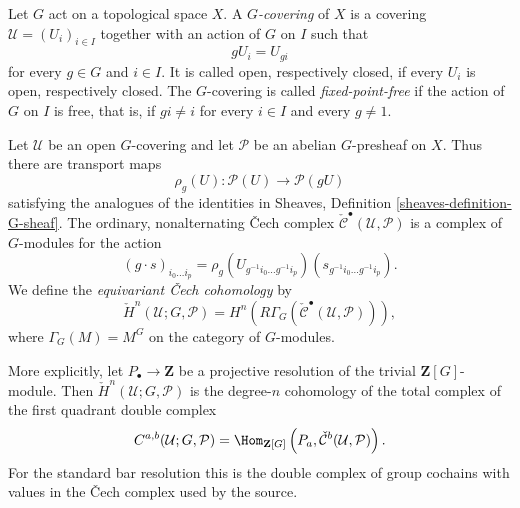 \begin{definition}
\label{definition-equivariant-cech-cohomology}
\begin{reference}
\cite[Chapter V, \S 5.5, p. 208]{Tohoku}
\end{reference}
Let $G$ act on a topological space $X$. A \emph{$G$-covering} of $X$
is a covering $\mathcal{U}=(U_i)_{i\in I}$ together with an action of
$G$ on $I$ such that
$$
gU_i=U_{gi}
$$
for every $g\in G$ and $i\in I$. It is called open, respectively closed,
if every $U_i$ is open, respectively closed.
The $G$-covering is called \emph{fixed-point-free} if the action of $G$
on $I$ is free, that is, if $gi\neq i$ for every $i\in I$ and every
$g\neq 1$.

Let $\mathcal{U}$ be an open $G$-covering and let $\mathcal{P}$ be an
abelian $G$-presheaf on $X$. Thus there are transport maps
$$
\rho_g(U):\mathcal{P}(U)\longrightarrow\mathcal{P}(gU)
$$
satisfying the analogues of the identities in Sheaves, Definition
\ref{sheaves-definition-G-sheaf}. The ordinary, nonalternating
\v Cech complex $\check{\mathcal{C}}^\bullet(\mathcal{U},\mathcal{P})$
is a complex of $G$-modules for the action
$$
(g\cdot s)_{i_0\ldots i_p}
=\rho_g(U_{g^{-1}i_0\ldots g^{-1}i_p})
\left(s_{g^{-1}i_0\ldots g^{-1}i_p}\right).
$$
We define the \emph{equivariant \v Cech cohomology} by
$$
\check H^n(\mathcal{U};G,\mathcal{P})
=H^n\left(R\Gamma_G(
\check{\mathcal{C}}^\bullet(\mathcal{U},\mathcal{P}))\right),
$$
where $\Gamma_G(M)=M^G$ on the category of $G$-modules.

More explicitly, let $P_\bullet\to\mathbf Z$ be a projective resolution
of the trivial $\mathbf Z[G]$-module. Then
$\check H^n(\mathcal{U};G,\mathcal{P})$ is the degree-$n$ cohomology of
the total complex of the first quadrant double complex
$$
C^{a,b}(\mathcal{U};G,\mathcal{P})
=\Hom_{\mathbf Z[G]}\left(
P_a,\check{\mathcal{C}}^b(\mathcal{U},\mathcal{P})\right).
$$
For the standard bar resolution this is the double complex of group
cochains with values in the \v Cech complex used by the source.
\end{definition}

